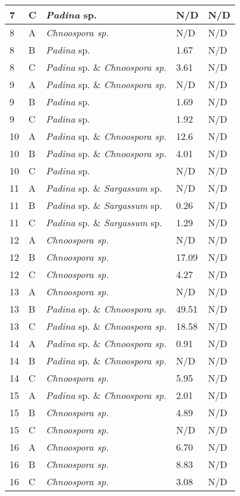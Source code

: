 \documentclass[12pt]{article}
\begin{document}
\begin{longtable}{ | p{2cm} | p{2cm} | p{3cm} | p{3.5cm} | p{3.5cm} | }
\hline
7&C&\emph{Padina} sp.&N/D&N/D\\
\hline
8&A&\emph{Chnoospora sp.}&N/D&N/D\\
\hline
8&B&\emph{Padina} sp.&1.67
&N/D\\
\hline
8&C&\emph{Padina} sp. \& \emph{Chnoospora sp.}&3.61
&N/D\\
\hline
9&A&\emph{Padina} sp. \& \emph{Chnoospora sp.}&N/D&N/D\\
\hline
9&B&\emph{Padina} sp.&1.69
&N/D\\
\hline
9&C&\emph{Padina} sp.&1.92
&N/D\\
\hline
10&A&\emph{Padina} sp. \& \emph{Chnoospora sp.}&12.6
&N/D\\
\hline
10&B&\emph{Padina} sp. \& \emph{Chnoospora sp.}&4.01
&N/D\\
\hline
10&C&\emph{Padina} sp.&N/D&N/D\\
\hline
11&A&\emph{Padina} sp. \& \emph{Sargassum} sp.&N/D&N/D\\
\hline
11&B&\emph{Padina} sp. \& \emph{Sargassum} sp.&0.26
&N/D\\
\hline
11&C&\emph{Padina} sp. \& \emph{Sargassum} sp.&1.29
&N/D\\
\hline
12&A&\emph{Chnoospora sp.}&N/D&N/D\\
\hline
12&B&\emph{Chnoospora sp.}&17.09
&N/D\\
\hline
12&C&\emph{Chnoospora sp.}&4.27
&N/D\\
\hline
13&A&\emph{Chnoospora sp.}&N/D&N/D\\
\hline
13&B&\emph{Padina} sp. \& \emph{Chnoospora sp.}&49.51
&N/D\\
\hline
13&C&\emph{Padina} sp. \& \emph{Chnoospora sp.}&18.58
&N/D\\
\hline
14&A&\emph{Padina} sp. \& \emph{Chnoospora sp.}&0.91
&N/D\\
\hline
14&B&\emph{Padina} sp. \& \emph{Chnoospora sp.}&N/D&N/D\\
\hline
14&C&\emph{Chnoospora sp.}&5.95
&N/D\\
\hline
15&A&\emph{Padina} sp. \& \emph{Chnoospora sp.}&2.01
&N/D\\
\hline
15&B&\emph{Chnoospora sp.}&4.89
&N/D\\
\hline
15&C&\emph{Chnoospora sp.}&N/D&N/D\\
\hline
16&A&\emph{Chnoospora sp.}&6.70&N/D\\
\hline
16&B&\emph{Chnoospora sp.}&8.83
&N/D\\
\hline
16&C&\emph{Chnoospora sp.}&3.08
&N/D\\

\end{longtable}
\end{document}
